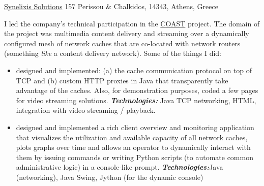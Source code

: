 \documentclass[helvetica,english,logo,notitle,totpages,utf8]{europecv2013}
\newcommand{\technologies}[0]{\textbf{\textit{Technologies:}}}
\begin{document}
\begin{europecv}
                   {\href{http://www.synelixis.com}{Synelixis Solutions}}
                   {157 Perissou \& Chalkidos, 14343, Athens, Greece}
                   {
                     I led the company's technical participation in the \href{http://www.synelixis.com/coast/}{COAST} project.
                     The domain of the project was multimedia
    content delivery and streaming over a dynamically configured mesh of network caches that are co-located
    with network routers (something \textit{like} a content delivery network).
    Some of the things I did:
    \begin{itemize}
    \item designed and implemented: (a) the cache communication protocol on top of TCP and (b) custom HTTP proxies
      in Java that transparently take advantage of the caches. Also, for demonstration purposes, coded
      a few pages for video streaming solutions.
       \technologies{} Java TCP networking, HTML, integration with video streaming / playback.
    \item designed and implemented a rich client overview and monitoring application that visualizes
      the utilization and available capacity of all network caches, plots graphs over time and allows
      an operator to dynamically interact with them by issuing commands or writing Python scripts
      (to automate common administrative logic) in a console-like prompt.
       \technologies Java (networking), Java Swing, Jython (for the dynamic console)
    \end{itemize}
                   }


\end{europecv}
\end{document}

